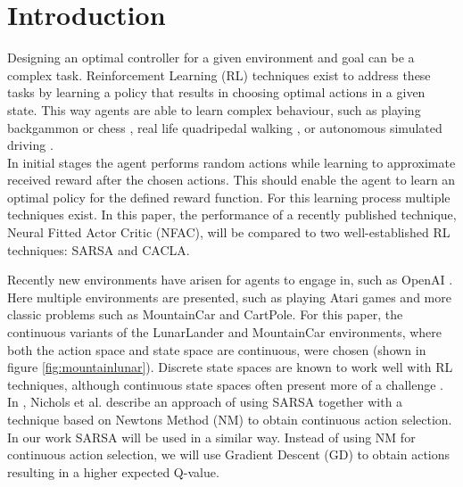 
\section{Introduction}

Designing an optimal controller for a given environment and goal can be a complex task. Reinforcement Learning (RL) techniques exist to address these tasks by learning a policy that results in choosing optimal actions in a given state. This way agents are able to learn complex behaviour, such as playing backgammon \cite{tesauro2002programming} or chess \cite{baxter1999knightcap},
real life quadripedal walking \cite{kohl2004policy}, or autonomous simulated driving \cite{}. \\  %


In initial stages the agent performs random actions while learning to approximate received reward after the chosen actions. This should enable the agent to learn an optimal policy for the defined reward function. For this learning process multiple techniques exist. In this paper, the performance of a recently published technique, Neural Fitted Actor Critic (NFAC), will be compared to two well-established RL techniques: SARSA and CACLA.   

Recently new environments have arisen for agents to engage in, such as OpenAI \cite{openaigym}. Here multiple environments are presented, such as playing Atari games and more classic problems such as MountainCar and CartPole. For this paper, the continuous variants of the LunarLander and MountainCar environments, where both the action space and state space are continuous, were chosen (shown in figure \ref{fig:mountainlunar}). Discrete state spaces are known to work well with RL techniques, although continuous state spaces often present more of a challenge \cite{cetina2008multilayer}. \\

In \cite{nichols2015continuous}, Nichols et al. describe an approach of using SARSA together with a technique based on Newtons Method (NM) to obtain continuous action selection. In our work SARSA will be used in a similar way. Instead of using NM for continuous action selection, we will use Gradient Descent (GD) to obtain actions resulting in a higher expected Q-value.

